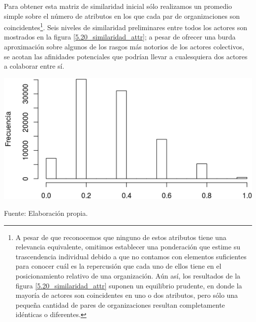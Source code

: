 \documentclass[letterpaper, 11pt]{book}
\theoremstyle{definition}
\theoremstyle{remark}
\begin{document}
Para obtener esta matriz de similaridad inicial sólo realizamos un promedio simple sobre el número de atributos en los que cada par de organizaciones son coincidentes\footnote{
    A pesar de que reconocemos que ninguno de estos atributos tiene una relevancia equivalente, omitimos establecer una ponderación que estime su trascendencia individual debido a que no contamos con elementos suficientes para conocer cuál es la repercusión que cada uno de ellos tiene en el posicionamiento relativo de una organización. 
    Aún así, los resultados de la figura \ref{5.20_similaridad_attr} suponen un equilibrio prudente, en donde la mayoría de actores son coincidentes en uno o dos atributos, pero sólo una pequeña cantidad de pares de organizaciones resultan completamente idénticas o diferentes. 
}. 
Seis niveles de similaridad preliminares entre todos los actores son mostrados en la figura \ref{5.20_similaridad_attr}; a pesar de ofrecer una burda aproximación sobre algunos de los rasgos más notorios de los actores colectivos, se acotan las afinidades potenciales que podrían llevar a cualesquiera dos actores a colaborar entre sí. 

\begin{minipage}{\linewidth}
\centering
{} \label{5.20_similaridad_attr}
\includegraphics[scale=0.75]{img/5.20_similaridad_attr.png}
\par
\small Fuente: Elaboración propia. 
\end{minipage}\bigskip
\end{document}
